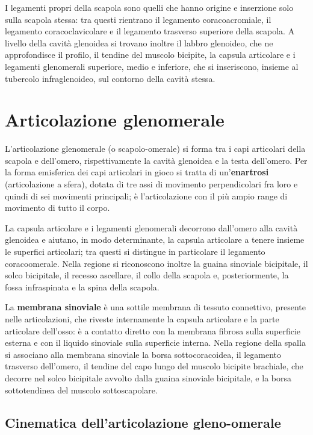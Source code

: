 I legamenti propri della scapola sono quelli che hanno origine e
inserzione solo sulla scapola stessa: tra questi rientrano il legamento
coracoacromiale, il legamento coracoclavicolare e il legamento trasverso
superiore della scapola. A livello della cavità glenoidea si trovano
inoltre il labbro glenoideo, che ne approfondisce il profilo, il tendine
del muscolo bicipite, la capsula articolare e i legamenti glenomerali
superiore, medio e inferiore, che si inseriscono, insieme al tubercolo
infraglenoideo, sul contorno della cavità stessa.

\section{Articolazione glenomerale}

L'articolazione glenomerale (o scapolo-omerale) si forma tra i capi
articolari della scapola e dell'omero, rispettivamente la cavità glenoidea
e la testa dell'omero. Per la forma emisferica dei capi articolari in
gioco si tratta di un'\textbf{enartrosi} (articolazione a sfera), dotata di
tre assi di movimento perpendicolari fra loro e quindi di sei movimenti
principali; è l'articolazione con il più ampio range di movimento di tutto
il corpo.

La capsula articolare e i legamenti glenomerali decorrono dall'omero alla
cavità glenoidea e aiutano, in modo determinante, la capsula articolare a
tenere insieme le superfici articolari; tra questi si distingue in
particolare il legamento coracoomerale. Nella regione si riconoscono
inoltre la guaina sinoviale bicipitale, il solco bicipitale, il recesso
ascellare, il collo della scapola e, posteriormente, la fossa
infraspinata e la spina della scapola.

La \textbf{membrana sinoviale} è una sottile membrana di tessuto
connettivo, presente nelle articolazioni, che riveste internamente la
capsula articolare e la parte articolare dell'osso: è a contatto diretto
con la membrana fibrosa sulla superficie esterna e con il liquido
sinoviale sulla superficie interna. Nella regione della spalla si
associano alla membrana sinoviale la borsa sottocoracoidea, il legamento
trasverso dell'omero, il tendine del capo lungo del muscolo bicipite
brachiale, che decorre nel solco bicipitale avvolto dalla guaina sinoviale
bicipitale, e la borsa sottotendinea del muscolo sottoscapolare.

\subsection{Cinematica dell'articolazione gleno-omerale}

